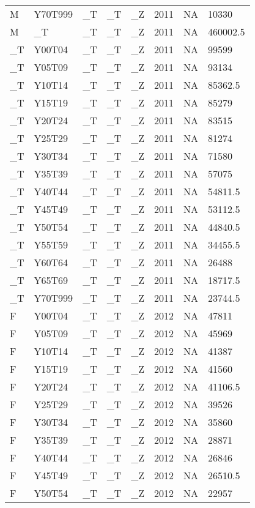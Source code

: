 \begin{longtable}[t]{llllllll}
M & Y70T999 & \_T & \_T & \_Z & 2011 & NA & 10330\\
M & \_T & \_T & \_T & \_Z & 2011 & NA & 460002.5\\
\_T & Y00T04 & \_T & \_T & \_Z & 2011 & NA & 99599\\
\addlinespace
\_T & Y05T09 & \_T & \_T & \_Z & 2011 & NA & 93134\\
\_T & Y10T14 & \_T & \_T & \_Z & 2011 & NA & 85362.5\\
\_T & Y15T19 & \_T & \_T & \_Z & 2011 & NA & 85279\\
\_T & Y20T24 & \_T & \_T & \_Z & 2011 & NA & 83515\\
\_T & Y25T29 & \_T & \_T & \_Z & 2011 & NA & 81274\\
\addlinespace
\_T & Y30T34 & \_T & \_T & \_Z & 2011 & NA & 71580\\
\_T & Y35T39 & \_T & \_T & \_Z & 2011 & NA & 57075\\
\_T & Y40T44 & \_T & \_T & \_Z & 2011 & NA & 54811.5\\
\_T & Y45T49 & \_T & \_T & \_Z & 2011 & NA & 53112.5\\
\_T & Y50T54 & \_T & \_T & \_Z & 2011 & NA & 44840.5\\
\addlinespace
\_T & Y55T59 & \_T & \_T & \_Z & 2011 & NA & 34455.5\\
\_T & Y60T64 & \_T & \_T & \_Z & 2011 & NA & 26488\\
\_T & Y65T69 & \_T & \_T & \_Z & 2011 & NA & 18717.5\\
\_T & Y70T999 & \_T & \_T & \_Z & 2011 & NA & 23744.5\\
F & Y00T04 & \_T & \_T & \_Z & 2012 & NA & 47811\\
\addlinespace
F & Y05T09 & \_T & \_T & \_Z & 2012 & NA & 45969\\
F & Y10T14 & \_T & \_T & \_Z & 2012 & NA & 41387\\
F & Y15T19 & \_T & \_T & \_Z & 2012 & NA & 41560\\
F & Y20T24 & \_T & \_T & \_Z & 2012 & NA & 41106.5\\
F & Y25T29 & \_T & \_T & \_Z & 2012 & NA & 39526\\
\addlinespace
F & Y30T34 & \_T & \_T & \_Z & 2012 & NA & 35860\\
F & Y35T39 & \_T & \_T & \_Z & 2012 & NA & 28871\\
F & Y40T44 & \_T & \_T & \_Z & 2012 & NA & 26846\\
F & Y45T49 & \_T & \_T & \_Z & 2012 & NA & 26510.5\\
F & Y50T54 & \_T & \_T & \_Z & 2012 & NA & 22957\\

\end{longtable}
